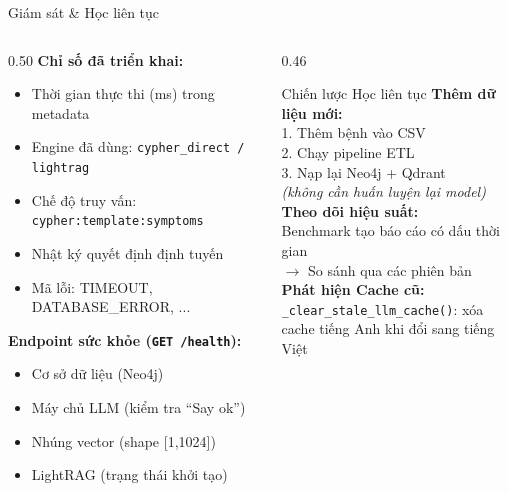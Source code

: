 \documentclass[aspectratio=169, 11pt]{beamer}
\begin{document}
\begin{frame}{Giám sát \& Học liên tục}
  \begin{columns}[t]
    \begin{column}{0.50\textwidth}
      \textbf{Chỉ số đã triển khai:}
      \begin{itemize}
        \scriptsize
        \item Thời gian thực thi (ms) trong metadata
        \item Engine đã dùng: \texttt{cypher\_direct / lightrag}
        \item Chế độ truy vấn: \texttt{cypher:template:symptoms}
        \item Nhật ký quyết định định tuyến
        \item Mã lỗi: TIMEOUT, DATABASE\_ERROR, ...
      \end{itemize}
      \vspace{0.4em}
      \textbf{Endpoint sức khỏe (\texttt{GET /health}):}
      \begin{itemize}
        \scriptsize
        \item[\textcolor{successGreen}{\checkmark}] Cơ sở dữ liệu (Neo4j)
        \item[\textcolor{successGreen}{\checkmark}] Máy chủ LLM (kiểm tra ``Say ok'')
        \item[\textcolor{successGreen}{\checkmark}] Nhúng vector (shape [1,1024])
        \item[\textcolor{successGreen}{\checkmark}] LightRAG (trạng thái khởi tạo)
      \end{itemize}
    \end{column}
    \begin{column}{0.46\textwidth}
      \begin{block}{Chiến lược Học liên tục}
        \scriptsize
        \textbf{Thêm dữ liệu mới:}\\
        1. Thêm bệnh vào CSV\\
        2. Chạy pipeline ETL\\
        3. Nạp lại Neo4j + Qdrant\\
        \textit{(không cần huấn luyện lại model)}\\[4pt]
        \textbf{Theo dõi hiệu suất:}\\
        Benchmark tạo báo cáo có dấu thời gian\\
        $\to$ So sánh qua các phiên bản\\[4pt]
        \textbf{Phát hiện Cache cũ:}\\
        \texttt{\_clear\_stale\_llm\_cache()}: xóa\\
        cache tiếng Anh khi đổi sang tiếng Việt
      \end{block}
    \end{column}
  \end{columns}
\end{frame}
\end{document}

